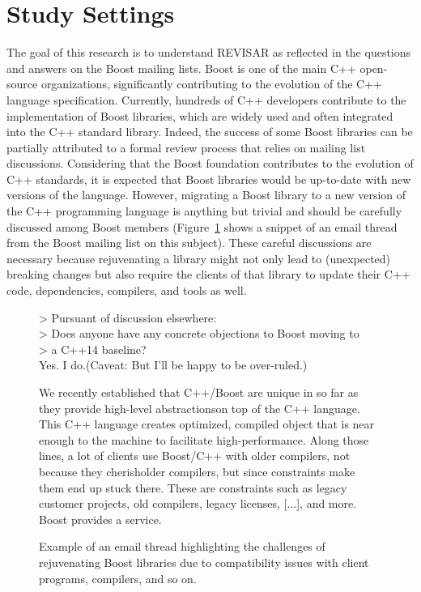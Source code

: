 \section{Study Settings}

The goal of this research is to understand {\color{red} REVISAR}
as reflected in the questions and answers on the Boost mailing lists.
Boost is one of the main C++ open-source organizations, significantly contributing to the evolution of the C++
language specification. Currently, hundreds of C++ developers contribute to the implementation of Boost libraries,
which are widely used and often integrated into the C++ standard library. Indeed,
the success of some Boost libraries can be partially attributed to a formal review
process that relies on mailing list discussions. Considering that the Boost foundation contributes to the evolution
of C++ standards, it is expected that Boost libraries would be up-to-date with new versions of the language.
However, migrating a Boost library to a new version of the C++ programming language is anything but trivial and
should be carefully discussed among Boost members (Figure~\ref{fig:email1} shows a snippet of an email thread from the
Boost mailing list on this subject). These careful discussions are necessary because rejuvenating a library
might not only lead to (unexpected) breaking changes but also require the clients of that library to update their C++ code, dependencies,
compilers, and tools as well. 

\begin{figure}[htb]
\begin{mdframed}[backgroundcolor=gray!40,shadow=true,roundcorner=8pt]
  \begin{small}
> Pursuant of discussion elsewhere: \\
> Does anyone have any concrete objections to Boost moving to \\
> a C++14 baseline? \\

Yes. I do.(Caveat: But I'll be happy to be over-ruled.)

We recently established that C++/Boost are unique in so far as they provide high-level abstractionson top of the C++ language. This C++ language creates optimized, compiled object that is near enough to the machine to facilitate high-performance. Along those lines, a lot of clients use Boost/C++ with older compilers, not because they cherisholder compilers, but since constraints make them end up stuck there. These are constraints such as legacy customer projects, old compilers, legacy licenses, [...], and more. Boost provides a service.
\end{small}
\end{mdframed}
\caption{Example of an email thread highlighting the challenges of rejuvenating Boost libraries due
  to compatibility issues with client programs, compilers, and so on.}
\label{fig:email1}
\end{figure}

